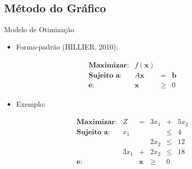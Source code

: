 \documentclass{if-beamer}
\begin{document}
\subsection{Método do Gráfico}
\begin{frame}{Modelo de Otimização}

\begin{minipage}{.49\textwidth}

\begin{itemize}
    \item Forma-padrão (HILLIER, 2010):
\end{itemize}
\begin{align*}
\begin{matrix}
    \textbf{Maximizar:} & f(\mathbf{x}) & & \\
    \textbf{Sujeito a:} & A\mathbf{x} & = & \mathbf{b} \\
    \textbf{e:} & \mathbf{x} & \geq & 0
\end{matrix}    
\end{align*}

\vspace{.8cm}

\begin{itemize}
    \item Exemplo:
\end{itemize}
\begin{align*}
\begin{matrix}
    \textbf{Maximizar:} & Z & = & 3x_1 & + & 5x_2 \\
    \textbf{Sujeito a:} &  x_1 &   &      & \leq & 4  \\
                        &      &   & 2x_2 & \leq & 12 \\
                        & 3x_1 & + & 2x_2 & \leq & 18 \\
    \textbf{e:}         &      & \mathbf{x} & \geq & 0 & 
\end{matrix}
\end{align*}

\end{minipage}
\begin{minipage}{.49\textwidth}


\end{minipage}
\end{frame}
\end{document}
